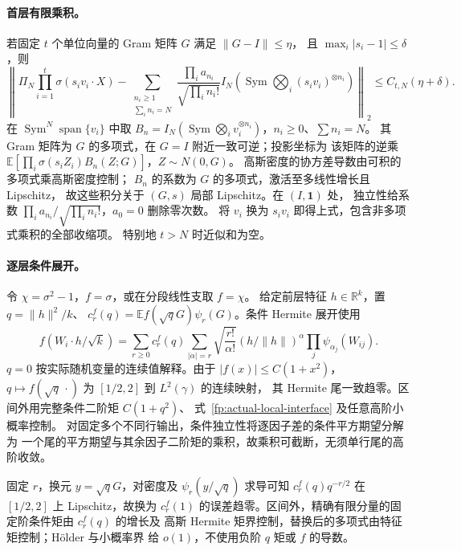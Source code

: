 \documentclass[a4paper]{tufte-handout}
\newcommand{\E}{\mathbb E}
\newcommand{\R}{\mathbb R}
\DeclareMathOperator{\Sym}{Sym}
\begin{document}
\begin{fullwidth}
\paragraph{首层有限乘积。}
若固定 $t$ 个单位向量的 Gram 矩阵 $G$ 满足 $\|G-I\|\le\eta$，
且 $\max_i|s_i-1|\le\delta$，则
\begin{equation}\label{fp:actual-ridge-projection}
 \left\|\Pi_N\prod_{i=1}^t\sigma(s_iv_i\cdot X)
 -\sum_{\substack{n_i\ge1\\\sum_i n_i=N}}
 \frac{\prod_i a_{n_i}}{\sqrt{\prod_i n_i!}}
 I_N\!\left(\Sym\bigotimes_i(s_iv_i)^{\otimes n_i}\right)
 \right\|_2\le C_{t,N}(\eta+\delta).
\end{equation}
在 $\Sym^N\operatorname{span}\{v_i\}$ 中取
$B_n=I_N(\Sym\bigotimes_i v_i^{\otimes n_i})$，$n_i\ge0$、$\sum n_i=N$。
其 Gram 矩阵为 $G$ 的多项式，在 $G=I$ 附近一致可逆；投影坐标为
该矩阵的逆乘 $\E[\prod_i\sigma(s_iZ_i)B_n(Z;G)]$，$Z\sim N(0,G)$。
高斯密度的协方差导数由可积的多项式乘高斯密度控制；
$B_n$ 的系数为 $G$ 的多项式，激活至多线性增长且 Lipschitz，
故这些积分关于 $(G,s)$ 局部 Lipschitz。在 $(I,\mathbf1)$ 处，
独立性给系数 $\prod_i a_{n_i}/\sqrt{\prod_i n_i!}$，$a_0=0$ 删除零次数。
将 $v_i$ 换为 $s_iv_i$ 即得上式，包含非多项式乘积的全部收缩项。
特别地 $t>N$ 时近似和为空。

\paragraph{逐层条件展开。}
令 $\chi=\sigma^2-1$，$f=\sigma$，或在分段线性支取 $f=\chi$。
给定前层特征 $h\in\R^k$，置 $q=\|h\|^2/k$、
$c_r^f(q)=\E f(\sqrt qG)\psi_r(G)$。条件 Hermite 展开使用
\begin{equation}\label{fp:actual-multivariate}
 f(W_i\cdot h/\sqrt k)=\sum_{r\ge0}c_r^f(q)
 \sum_{|\alpha|=r}\sqrt{\frac{r!}{\alpha!}}
 (h/\|h\|)^\alpha\prod_j\psi_{\alpha_j}(W_{ij}).
\end{equation}
$q=0$ 按实际随机变量的连续值解释。由于 $|f(x)|\le C(1+x^2)$，
$q\mapsto f(\sqrt q\,\cdot)$ 为 $[1/2,2]$ 到 $L^2(\gamma)$ 的连续映射，
其 Hermite 尾一致趋零。区间外用完整条件二阶矩 $C(1+q^2)$、
式~\eqref{fp:actual-local-interface} 及任意高阶小概率控制。
对固定多个不同行输出，条件独立性将逐因子差的条件平方期望分解为
一个尾的平方期望与其余因子二阶矩的乘积，故乘积可截断，无须单行尾的高阶收敛。

固定 $r$，换元 $y=\sqrt qG$，对密度及 $\psi_r(y/\sqrt q)$ 求导可知
$c_r^f(q)q^{-r/2}$ 在 $[1/2,2]$ 上 Lipschitz，故换为 $c_r^f(1)$ 的误差趋零。区间外，精确有限分量的固定阶条件矩由 $c_r^f(q)$ 的增长及
高斯 Hermite 矩界控制，替换后的多项式由特征矩控制；H\"older 与小概率界
给 $o(1)$，不使用负阶 $q$ 矩或 $f$ 的导数。


\end{fullwidth}
\end{document}
